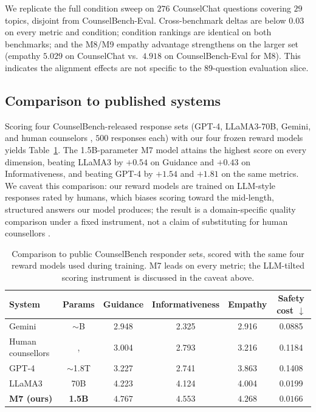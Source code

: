 \documentclass[10pt,twocolumn]{article}
\begin{document}
We replicate the full condition sweep on $276$ CounselChat questions covering $29$ topics, disjoint from CounselBench-Eval. Cross-benchmark deltas are below $0.03$ on every metric and condition; condition rankings are identical on both benchmarks; and the M8/M9 empathy advantage strengthens on the larger set (empathy $5.029$ on CounselChat vs.\ $4.918$ on CounselBench-Eval for M8). This indicates the alignment effects are not specific to the 89-question evaluation slice.

\subsection*{Comparison to published systems}

Scoring four CounselBench-released response sets (GPT-4, LLaMA3-70B, Gemini, and human counselors ,  $500$ responses each) with our four frozen reward models yields Table~\ref{tab:baselines}. The 1.5B-parameter M7 model attains the highest score on every dimension, beating LLaMA3 by $+0.54$ on Guidance and $+0.43$ on Informativeness, and beating GPT-4 by $+1.54$ and $+1.81$ on the same metrics. We caveat this comparison: our reward models are trained on LLM-style responses rated by humans, which biases scoring toward the mid-length, structured answers our model produces; the result is a domain-specific quality comparison under a fixed instrument, not a claim of substituting for human counsellors \citep{ouyang2022rlhf, bai2022hh}.

\begin{table}[!t]
\centering
\small
\begin{tabular}{lccccc}
\toprule
System & Params & Guidance & Informativeness & Empathy & Safety cost $\downarrow$ \\
\midrule
Gemini~\citep{team2023gemini}   & ${\sim}$B  & 2.948 & 2.325 & 2.916 & 0.0885 \\
Human counsellors               & ,         & 3.004 & 2.793 & 3.216 & 0.1184 \\
GPT-4~\citep{openai2023gpt4}    & ${\sim}$1.8T & 3.227 & 2.741 & 3.863 & 0.1408 \\
LLaMA3~\citep{dubey2024llama3}  & 70B        & 4.223 & 4.124 & 4.004 & 0.0199 \\
\textbf{M7 (ours)}              & \textbf{1.5B} & $\mathbf{4.767}$ & $\mathbf{4.553}$ & $\mathbf{4.268}$ & $\mathbf{0.0166}$ \\
\bottomrule
\end{tabular}
\caption{Comparison to public CounselBench responder sets, scored with the same four reward models used during training. M7 leads on every metric; the LLM-tilted scoring instrument is discussed in the caveat above.}
\label{tab:baselines}
\end{table}
\end{document}
